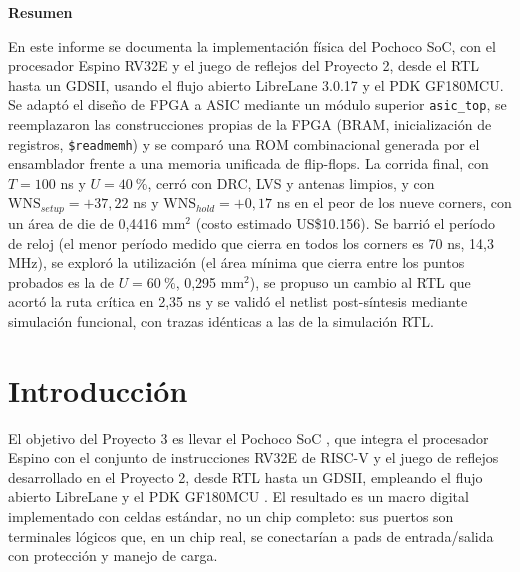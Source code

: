 \documentclass[11pt,letterpaper]{article}
\newcommand{\code}[1]{\texttt{#1}}
\begin{document}
\newpage
\begin{center}\textbf{Resumen}\end{center}
\noindent En este informe se documenta la implementación física del Pochoco SoC, con el procesador Espino RV32E y el juego de reflejos del Proyecto 2, desde el RTL hasta un GDSII, usando el flujo abierto LibreLane 3.0.17 y el PDK GF180MCU. Se adaptó el diseño de FPGA a ASIC mediante un módulo superior \code{asic\_top}, se reemplazaron las construcciones propias de la FPGA (BRAM, inicialización de registros, \code{\$readmemh}) y se comparó una ROM combinacional generada por el ensamblador frente a una memoria unificada de flip-flops. La corrida final, con $T=100$ ns y $U=40~\%$, cerró con DRC, LVS y antenas limpios, y con $\mathrm{WNS}_{setup}=+37{,}22$ ns y $\mathrm{WNS}_{hold}=+0{,}17$ ns en el peor de los nueve corners, con un área de die de 0,4416 mm$^2$ (costo estimado US\$10.156). Se barrió el período de reloj (el menor período medido que cierra en todos los corners es 70 ns, 14,3 MHz), se exploró la utilización (el área mínima que cierra entre los puntos probados es la de $U=60~\%$, 0,295 mm$^2$), se propuso un cambio al RTL que acortó la ruta crítica en 2,35 ns y se validó el netlist post-síntesis mediante simulación funcional, con trazas idénticas a las de la simulación RTL.

\newpage
\setcounter{tocdepth}{1}
\tableofcontents
\newpage

\section{Introducción}

El objetivo del Proyecto 3 es llevar el Pochoco SoC \cite{pochoco}, que integra el procesador Espino con el conjunto de instrucciones RV32E de RISC-V \cite{riscv} y el juego de reflejos desarrollado en el Proyecto 2, desde RTL hasta un GDSII, empleando el flujo abierto LibreLane y el PDK GF180MCU \cite{librelane,gf180}. El resultado es un macro digital implementado con celdas estándar, no un chip completo: sus puertos son terminales lógicos que, en un chip real, se conectarían a pads de entrada/salida con protección y manejo de carga.
\end{document}
